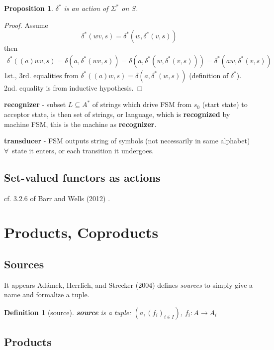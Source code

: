 \documentclass[10pt]{amsart}
\newtheorem{proposition}{Proposition}
\newtheorem{definition}{Definition}
\begin{document}
\begin{multicols*}{2}
\begin{proposition}
	$\delta^*$ is an action of $\Sigma^*$ on $S$.
\end{proposition}

\begin{proof}
	Assume
	\[
	\delta^*(wv, s) = \delta^*(w, \delta^*(v,s))
	\]	
	then
	\[
	\begin{gathered}
		\delta^*((a)wv, s) = \delta(a, \delta^*(wv, s)) = \delta(a, \delta^*(w, \delta^*(v,s))) = \delta^*(aw, \delta^*(v,s)) 
	\end{gathered}
	\]
1st., 3rd. equalities from $\delta^*((a)w, s) = \delta(a, \delta^*(w,s))$ (definition of $\delta^*$). \\
2nd. equality is from inductive hypothesis.
\end{proof}

\textbf{recognizer} - subset $L\subseteq A^*$ of strings which drive FSM from $s_0$ (start state) to acceptor state, is then set of strings, or language, which is \textbf{recognized} by machine FSM, this is the machine as \textbf{recognizer}.

\textbf{transducer} - FSM outputs string of symbols (not necessarily in same alphabet) $\forall \, $ state it enters, or each transition it undergoes.

\subsection{Set-valued functors as actions}

cf. 3.2.6 of Barr and Wells (2012) \cite{BaWe2012}. 


\section{Products, Coproducts}

\subsection{Sources}

It appears Ad\'{a}mek, Herrlich, and Strecker (2004) \cite{AHS2004} defines \emph{sources} to simply give a name and formalize a tuple.  

\begin{definition}[source]
	\textbf{source} is a tuple: $(a, (f_i)_{i\in I})$, $f_i:A\to A_i$
\end{definition}

\subsection{Products}


\end{multicols*}
\end{document}
